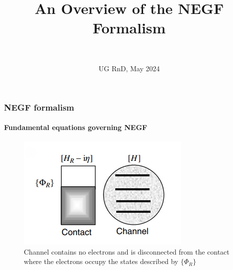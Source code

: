\documentclass{beamer}
\title[\textit{Contact-ing} the Schrödinger]{An Overview of the NEGF Formalism} %
\author%
{%
    \sc{Debasish Panda}\\
    \sc{21d070021}
}
\institute%
{%
    \textit{Department of Electrical Engineering}\\
    \textit{Indian Institute of Technology, Bombay}
}
\date[2024]{UG RnD, May 2024}
\begin{document}
    \begin{frame}[plain]
        \titlepage
    \end{frame}


{

    \begin{frame}

        \frametitle{NEGF formalism}
        \framesubtitle{Fundamental equations governing NEGF}
        \scriptsize

\vspace{30pt}

\begin{figure}[!htbp]
\centering
\includegraphics[scale=0.4]{ngef_1.png}
\caption{\scriptsize Channel contains no electrons and is disconnected from the contact where the electrons occupy the states described by $\{\Phi_{R}\}$}
\end{figure}
        
    \end{frame}
}
\end{document}
